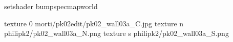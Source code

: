 setshader bumpspecmapworld

texture 0 morti/pk02edit/pk02_wall03a_C.jpg
texture n philipk2/pk02_wall03a_N.png
texture s philipk2/pk02_wall03a_S.png

